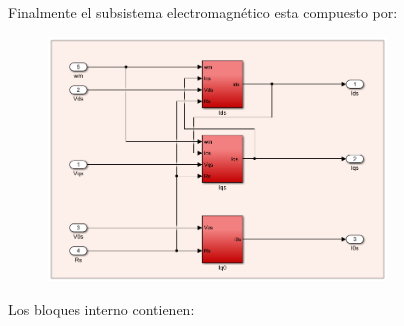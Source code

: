 \documentclass{article}
\begin{document}
Finalmente el subsistema electromagnético esta compuesto por:

\begin{figure}[H]
    \centering
    \includegraphics[width=0.8\textwidth]{sub_electromagentico.png}
\end{figure}

Los bloques interno contienen:
\end{document}
